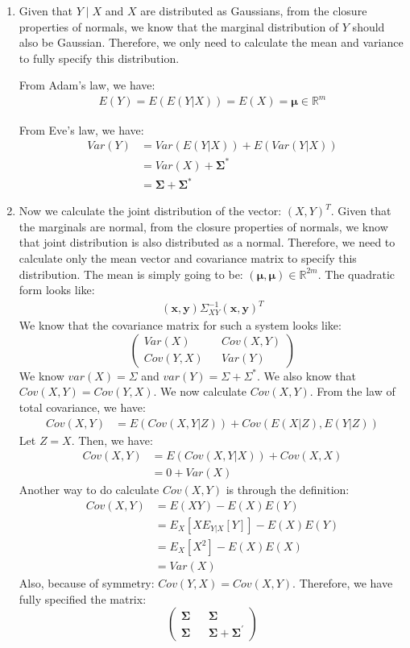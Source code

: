 \documentclass[submit]{harvardml}
\renewcommand{\v}[1]{\mathbf{#1}}
\begin{document}
\begin{enumerate}[label=(\alph*)]
	\item Given that $Y \mid X$ and $X$ are distributed as Gaussians, from the closure properties of normals, we know that the marginal distribution of $Y$ should also be Gaussian. Therefore, we only need to calculate the mean and variance to fully specify this distribution.
	
	From Adam's law, we have:
	\begin{align}
		E(Y) = E(E(Y|X)) = E(X) = \v{\mu} \in \mathbb{R}^m
	\end{align}
	
	From Eve's law, we have:
	\begin{align}
		Var(Y) &= Var(E(Y|X)) + E(Var(Y|X)) \\
			&= Var(X) + \v{\Sigma^*} \\
			&= \v{\Sigma} + \v{\Sigma^*}
	\end{align}
	
	\item Now we calculate the joint distribution of the vector: $(X,Y)^T$. Given that the marginals are normal, from the closure properties of normals, we know that joint distribution is also distributed as a normal. Therefore, we need to calculate only the mean vector and covariance matrix to specify this distribution. The mean is simply going to be: $(\v{\mu}, \v{\mu}) \in \mathbb{R}^{2m}$. The quadratic form looks like:
	\begin{align}
		(\v{x}, \v{y}) \Sigma_{XY}^{-1} (\v{x}, \v{y})^T
	\end{align}
	We know that the covariance matrix for such a system looks like:
	$$\begin{pmatrix}
		Var(X) && Cov(X,Y) \\
		Cov(Y,X) && Var(Y)
	\end{pmatrix}$$
	We know $var(X) = \Sigma$ and $var(Y) = \Sigma + \Sigma^*$. We also know that $Cov(X,Y) = Cov(Y,X)$. We now calculate $Cov(X,Y)$. From the law of total covariance, we have:
	\begin{align}
		Cov(X,Y) &= E(Cov(X,Y|Z)) + Cov(E(X|Z), E(Y|Z))
	\end{align}
	Let $Z=X$. Then, we have:
	\begin{align}
		Cov(X,Y) &= E(Cov(X,Y|X)) + Cov(X, X) \\
				&= 0 + Var(X)
	\end{align}
	Another way to do calculate $Cov(X,Y)$ is through the definition:
	\begin{align}
		Cov(X,Y) &= E(XY) - E(X)E(Y) \\
				&= E_{X} \left[X E_{Y|X} \left[Y\right]\right] - E(X)E(Y) \\
				&= E_X [X^2] - E(X) E(X) \\
				&= Var(X)
	\end{align}
	Also, because of symmetry: $Cov(Y,X) = Cov(X,Y)$. Therefore, we have fully specified the matrix:
	$$\begin{pmatrix}
		\v{\Sigma} && \v{\Sigma} \\
		\v{\Sigma} && \v{\Sigma} + \v{\Sigma^{'}}
	\end{pmatrix}$$
\end{enumerate}
\end{document}
